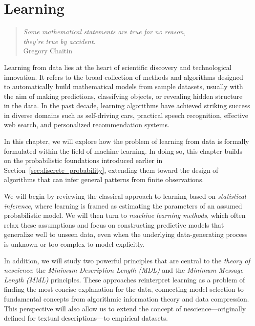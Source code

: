 %
%


\chapter{Learning}
\label{chap:Learning}

\begin{quote}
\begin{flushright}
\emph{Some mathematical statements are true for no reason,\\
they're true by accident.}\\
Gregory Chaitin
\end{flushright}
\end{quote}
\bigskip

Learning from data lies at the heart of scientific discovery and technological innovation. It refers to the broad collection of methods and algorithms designed to automatically build mathematical models from sample datasets, usually with the aim of making predictions, classifying objects, or revealing hidden structure in the data.  
In the past decade, learning algorithms have achieved striking success in diverse domains such as self-driving cars, practical speech recognition, effective web search, and personalized recommendation systems.

In this chapter, we will explore how the problem of learning from data is formally formulated within the field of machine learning. In doing so, this chapter builds on the probabilistic foundations introduced earlier in Section~\ref{sec:discrete_probability}, extending them toward the design of algorithms that can infer general patterns from finite observations.

We will begin by reviewing the classical approach to learning based on \emph{statistical inference}, where learning is framed as estimating the parameters of an assumed probabilistic model. We will then turn to \emph{machine learning methods}, which often relax these assumptions and focus on constructing predictive models that generalize well to unseen data, even when the underlying data-generating process is unknown or too complex to model explicitly.

In addition, we will study two powerful principles that are central to the \emph{theory of nescience}: the \emph{Minimum Description Length (MDL)} and the \emph{Minimum Message Length (MML)} principles. These approaches reinterpret learning as a problem of finding the most concise explanation for the data, connecting model selection to fundamental concepts from algorithmic information theory and data compression. This perspective will also allow us to extend the concept of nescience—originally defined for textual descriptions—to empirical datasets.

